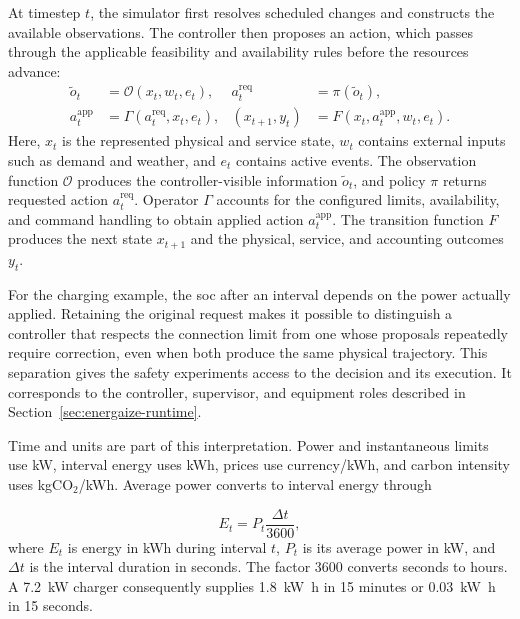 \begin{samepage}
At timestep $t$, the simulator first resolves scheduled changes and constructs the available observations. The controller then proposes an action, which passes through the applicable feasibility and availability rules before the resources advance:
\begin{equation}
\begin{aligned}
\tilde{o}_t&=\mathcal{O}(x_t,w_t,e_t), & a_t^{\mathrm{req}}&=\pi(\tilde{o}_t),\\
a_t^{\mathrm{app}}&=\Gamma(a_t^{\mathrm{req}},x_t,e_t), & (x_{t+1},y_t)&=F(x_t,a_t^{\mathrm{app}},w_t,e_t).
\end{aligned}
\label{eq:sim-step-contract}
\end{equation}
Here, $x_t$ is the represented physical and service state, $w_t$ contains external inputs such as demand and weather, and $e_t$ contains active events. The observation function $\mathcal{O}$ produces the controller-visible information $\tilde{o}_t$, and policy $\pi$ returns requested action $a_t^{\mathrm{req}}$. Operator $\Gamma$ accounts for the configured limits, availability, and command handling to obtain applied action $a_t^{\mathrm{app}}$. The transition function $F$ produces the next state $x_{t+1}$ and the physical, service, and accounting outcomes $y_t$.\par
\end{samepage}

For the charging example, the \gls{soc} after an interval depends on the power actually applied. Retaining the original request makes it possible to distinguish a controller that respects the connection limit from one whose proposals repeatedly require correction, even when both produce the same physical trajectory. This separation gives the safety experiments access to the decision and its execution. It corresponds to the controller, supervisor, and equipment roles described in Section~\ref{sec:energaize-runtime}.

Time and units are part of this interpretation. Power and instantaneous limits use kW, interval energy uses kWh, prices use currency/kWh, and carbon intensity uses kgCO$_2$/kWh. Average power converts to interval energy through
\begin{samepage}
\begin{equation}
E_t=P_t\frac{\Delta t}{3600},
\label{eq:sim-power-energy}
\end{equation}
where $E_t$ is energy in kWh during interval $t$, $P_t$ is its average power in kW, and $\Delta t$ is the interval duration in seconds. The factor 3600 converts seconds to hours. A \SI{7.2}{\kilo\watt} charger consequently supplies \SI{1.8}{\kilo\watt\hour} in 15 minutes or \SI{0.03}{\kilo\watt\hour} in 15 seconds.\par
\end{samepage}

